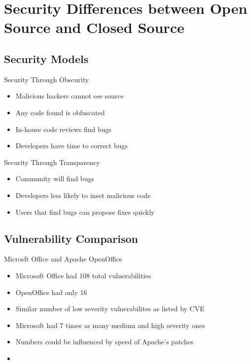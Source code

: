 \section{Security Differences between Open Source and Closed Source}\frame{\sectionpage}

\subsection{Security Models}
\begin{frame}{Security Through Obscurity}
  \begin{itemize}
    \item Malicious hackers cannot see source
    \item Any code found is obfuscated
    \item In-house code reviews find bugs
    \item Developers have time to correct bugs
  \end{itemize}
\end{frame}

\begin{frame}{Security Through Transparency}
  \begin{itemize}
    \item Community will find bugs
    \item Developers less likely to inset malicious code
    \item Users that find bugs can propose fixes quickly
  \end{itemize}
\end{frame}

\subsection{Vulnerability Comparison}
\begin{frame}{Microsft Office and Apache OpenOffice}
  \begin{itemize}
    \item Microsoft Office had 108 total vulnerabilities
    \item OpenOffice had only 16
    \item Similar number of low severity vulnerabilites as listed by CVE
    \item Microsoft had 7 times as many medium and high severity ones
    \item Numbers could be influenced by speed of Apache's patches
    \item\cite{kadura}
  \end{itemize}
\end{frame}

